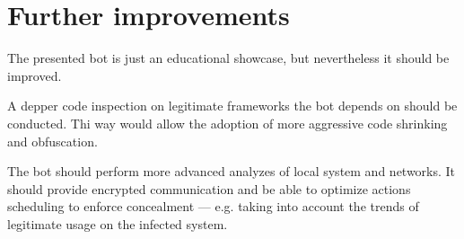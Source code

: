 \section{Further improvements}
\label{sec:further-improvements}

The presented bot is just an educational showcase, but nevertheless it should be improved.

A depper code inspection on legitimate frameworks the bot depends on should be conducted. Thi way would allow the adoption of more aggressive code shrinking and obfuscation.

The bot should perform more advanced analyzes of local system and networks. It should provide encrypted communication and be able to optimize actions scheduling to enforce concealment — e.g. taking into account the trends of legitimate usage on the infected system.
